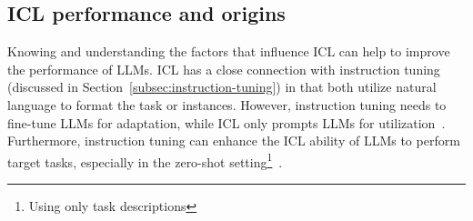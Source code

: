 \subsection{ICL performance and origins}
\label{subsec:icl-performance}

Knowing and understanding the factors that influence ICL can help to improve the performance of LLMs.
ICL has a close connection with instruction tuning (discussed in Section~\ref{subsec:instruction-tuning}) in that both utilize natural language to format the task or instances.
However, instruction tuning needs to fine-tune LLMs for adaptation, while ICL only prompts LLMs for utilization~\cite{survey}.
Furthermore, instruction tuning can enhance the ICL ability of LLMs to perform target tasks, especially in the zero-shot setting\footnote{Using only task descriptions}~\cite{chung2022scaling}.

